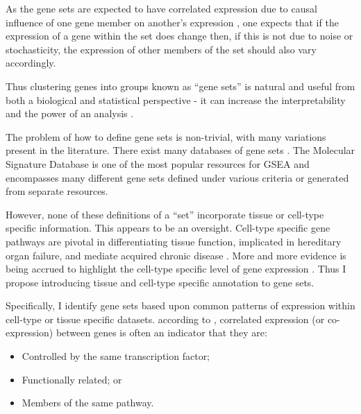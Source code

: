 \documentclass[14pt]{extarticle} %
\begin{document}
	As the gene sets are expected to have correlated expression due to causal influence of one gene member on another's expression \citep{WeirauchGeneCoexpressionNetworks2011}, one expects that if the expression of a gene within the set does change then, if this is not due to noise or stochasticity, the expression of other members of the set should also vary accordingly.
	
	Thus clustering genes into groups known as ``gene sets'' is natural and useful from both a biological and statistical perspective - it can increase the interpretability and the power of an analysis \citep{NicaExpressionquantitativetrait2013, VosaUnravelingpolygenicarchitecture2018}.
	
	
	The problem of how to define gene sets is non-trivial, with many variations present in the literature. There exist many databases of gene sets \citep{AshburnerGeneOntologytool2000a, KanehisaNewapproachunderstanding2019, SzklarczykSTRINGv11protein2019}. The Molecular Signature Database \citep{SubramanianGenesetenrichment2005a} is one of the most popular resources for GSEA and encompasses many different gene sets defined under various criteria or generated from separate resources. 
	
	However, none of these definitions of a ``set'' incorporate tissue or cell-type specific information. This appears to be an oversight. Cell-type specific gene pathways are pivotal in differentiating tissue function, implicated in hereditary organ failure, and mediate acquired chronic disease \citep{JuDefiningcelltypespecificity2013a}. More and more evidence is being accrued to highlight the cell-type specific level of gene expression \citep{GrundbergMappingcistransregulatory2012, OngEnhancerfunctionnew2011, ManiatisRegulationinducibletissuespecific1987}. Thus I propose introducing tissue and cell-type specific annotation to gene sets. 
	
	Specifically, I identify gene sets based upon common patterns of expression within cell-type or tissue specific datasets. according to \citet{WeirauchGeneCoexpressionNetworks2011}, correlated expression (or co-expression) between genes is often an indicator that they are:
	\begin{itemize}
		\item Controlled by the same transcription factor;
		\item Functionally related; or
		\item Members of the same pathway.
	\end{itemize}
\end{document}
